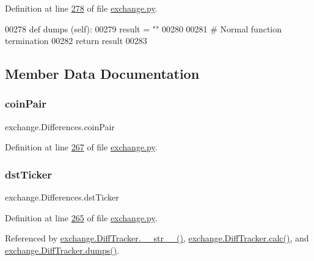 Definition at line \hyperlink{exchange_8py_source_l00278}{278} of file \hyperlink{exchange_8py_source}{exchange.\+py}.


\begin{DoxyCode}
00278     \textcolor{keyword}{def }dumps (self):
00279         result = \textcolor{stringliteral}{""} 
00280         
00281         \textcolor{comment}{# Normal function termination}
00282         \textcolor{keywordflow}{return} result
00283         
\end{DoxyCode}


\subsection{Member Data Documentation}
\mbox{\label{classexchange_1_1_differences_a88e6a458df95b4ff6896dd8231d28c8d}} 
\subsubsection{\texorpdfstring{coin\+Pair}{coinPair}}
{\footnotesize\ttfamily exchange.\+Differences.\+coin\+Pair}



Definition at line \hyperlink{exchange_8py_source_l00267}{267} of file \hyperlink{exchange_8py_source}{exchange.\+py}.

\mbox{\label{classexchange_1_1_differences_a80b6dd387553597287b07b64553c7ebd}} 
\subsubsection{\texorpdfstring{dst\+Ticker}{dstTicker}}
{\footnotesize\ttfamily exchange.\+Differences.\+dst\+Ticker}



Definition at line \hyperlink{exchange_8py_source_l00265}{265} of file \hyperlink{exchange_8py_source}{exchange.\+py}.



Referenced by \hyperlink{exchange_8py_source_l00336}{exchange.\+Diff\+Tracker.\+\_\+\+\_\+str\+\_\+\+\_\+()}, \hyperlink{exchange_8py_source_l00309}{exchange.\+Diff\+Tracker.\+calc()}, and \hyperlink{exchange_8py_source_l00385}{exchange.\+Diff\+Tracker.\+dumps()}.

